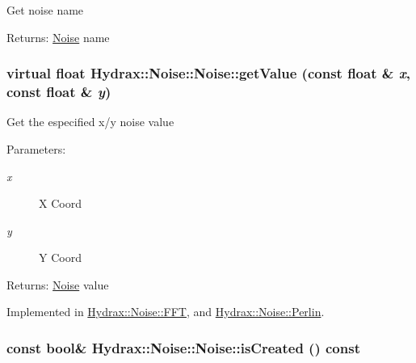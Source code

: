 Get noise name \begin{Desc}
\item[Returns:]\hyperlink{class_hydrax_1_1_noise_1_1_noise}{Noise} name \end{Desc}
\hypertarget{class_hydrax_1_1_noise_1_1_noise_5b18138d5c2c5ea3c3659cef80dd3a3e}{
\subsubsection[{getValue}]{\setlength{\rightskip}{0pt plus 5cm}virtual float Hydrax::Noise::Noise::getValue (const float \& {\em x}, \/  const float \& {\em y})}}
\label{class_hydrax_1_1_noise_1_1_noise_5b18138d5c2c5ea3c3659cef80dd3a3e}


Get the especified x/y noise value \begin{Desc}
\item[Parameters:]
\begin{description}
\item[{\em x}]X Coord \item[{\em y}]Y Coord \end{description}
\end{Desc}
\begin{Desc}
\item[Returns:]\hyperlink{class_hydrax_1_1_noise_1_1_noise}{Noise} value \end{Desc}


Implemented in \hyperlink{class_hydrax_1_1_noise_1_1_f_f_t_e7da5bf6c6ebfc9061ed433af6350ea7}{Hydrax::Noise::FFT}, and \hyperlink{class_hydrax_1_1_noise_1_1_perlin_64bbe19643e0a87c08c62d0e73d7aac6}{Hydrax::Noise::Perlin}.\hypertarget{class_hydrax_1_1_noise_1_1_noise_94f5963b8f6fed2fb22149ff22e1166f}{
\subsubsection[{isCreated}]{\setlength{\rightskip}{0pt plus 5cm}const bool\& Hydrax::Noise::Noise::isCreated () const}}
\label{class_hydrax_1_1_noise_1_1_noise_94f5963b8f6fed2fb22149ff22e1166f}


